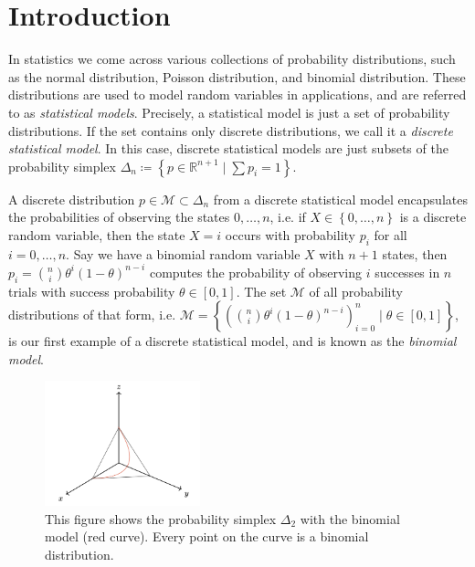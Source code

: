 \chapter{Introduction} 

In statistics we come across various collections of probability distributions, such as the normal distribution, Poisson distribution, and binomial distribution. These distributions are used to model random variables in applications, and are referred to as \emph{statistical models}. Precisely, a statistical model is just a set of probability distributions. If the set contains only discrete distributions, we call it a \emph{discrete statistical model}. In this case, discrete statistical models are just subsets of the probability simplex \( \Delta_n \coloneqq \left\{ p \in \mathbb{R}^{n + 1} \mid \sum p_i = 1 \right\} \). 

A discrete distribution \( p \in \mathcal{M} \subset \Delta_n \) from a discrete statistical model encapsulates the probabilities of observing the states \( 0, \dots, n \), i.e. if \( X \in \left\{ 0, \dots, n \right\} \) is a discrete random variable, then the state \( X = i \) occurs with probability \( p_i \) for all \( i = 0, \dots, n \). Say we have a binomial random variable \( X \) with \( n + 1 \) states, then \( p_i = \binom{n}{i} \theta^i (1-\theta)^{n-i} \) computes the probability of observing \( i \) successes in \( n \) trials with success probability \( \theta \in [0,1] \). The set \( \mathcal{M} \) of all probability distributions of that form, i.e. \( \mathcal{M} = \left\{ (\binom{n}{i} \theta^i (1-\theta)^{n-i})_{i=0}^n \mid \theta \in [0,1] \right\} \), is our first example of a discrete statistical model, and is known as the \emph{binomial model}.

\begin{figure}
    \centering
    \includegraphics[width=0.4\textwidth]{assets/binom-discrete-model.png}
    \caption{This figure shows the probability simplex \( \Delta_2 \) with the binomial model (red curve). Every point on the curve is a binomial distribution.}
    \label{fig:binom-discrete-model}
\end{figure}

